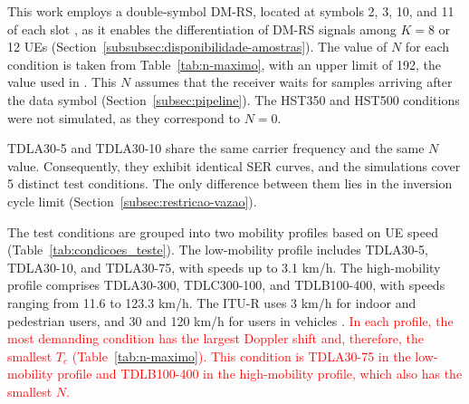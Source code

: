This work employs a double-symbol DM-RS, located at symbols 2, 3, 10, and 11 of each slot \cite[Tab.~6.4.1.1.3-4]{3gpp-ts38211}, as it enables the differentiation of DM-RS signals among $K = 8$ or 12 UEs (Section~\ref{subsubsec:disponibilidade-amostras}). The value of $N$ for each condition is taken from Table~\ref{tab:n-maximo}, with an upper limit of 192, the value used in \cite{zhao2025jsac}. This $N$ assumes that the receiver waits for samples arriving after the data symbol (Section~\ref{subsec:pipeline}). The HST350 and HST500 conditions were not simulated, as they correspond to $N = 0$.

TDLA30-5 and TDLA30-10 share the same carrier frequency and the same $N$ value. Consequently, they exhibit identical SER curves, and the simulations cover 5 distinct test conditions. The only difference between them lies in the inversion cycle limit (Section~\ref{subsec:restricao-vazao}).

The test conditions are grouped into two mobility profiles based on UE speed (Table~\ref{tab:condicoes_teste}). The low-mobility profile includes TDLA30-5, TDLA30-10, and TDLA30-75, with speeds up to 3.1 km/h. The high-mobility profile comprises TDLA30-300, TDLC300-100, and TDLB100-400, with speeds ranging from 11.6 to 123.3 km/h. The ITU-R uses 3 km/h for indoor and pedestrian users, and 30 and 120 km/h for users in vehicles \cite[Sec.~8.2 and Tab.~5]{itu-m2412}. \textcolor{red}{In each profile, the most demanding condition has the largest Doppler shift and, therefore, the smallest $T_c$ (Table~\ref{tab:n-maximo}). This condition is TDLA30-75 in the low-mobility profile and TDLB100-400 in the high-mobility profile, which also has the smallest $N$.}

